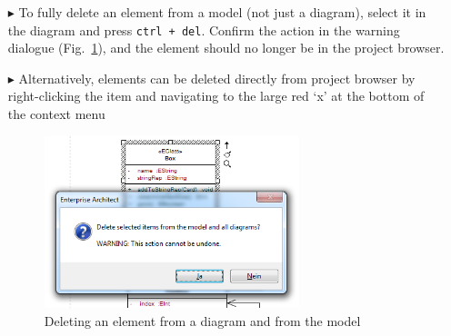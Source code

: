 \begin{itemize}
\item[$\blacktriangleright$] To fully delete an element from a model (not just a diagram), select it in the diagram and press \texttt{ctrl + del}. Confirm the
action in the warning dialogue (Fig.~\ref{ea:deleteWarning}), and the element should no longer be in the project browser.

\vspace{0.5cm}

\item[$\blacktriangleright$] Alternatively, elements can be deleted directly from project browser by right-clicking the item and navigating to the large
red `x' at the bottom of the context menu

\begin{figure}[htbp]
\begin{center}
  \includegraphics[width=0.7\textwidth]{ea_deleteWarning}
  \caption{Deleting an element from a diagram and from the model}  
  \label{ea:deleteWarning}
\end{center}
\end{figure}  

\end{itemize}
